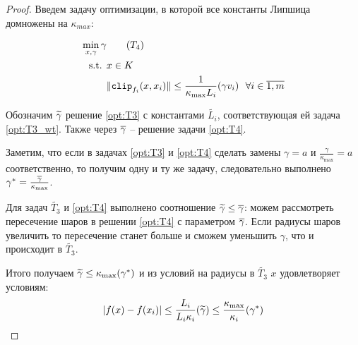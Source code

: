 \begin{proof}
     Введем задачу оптимизации, в которой все константы Липшица домножены на $\kappa_{max}$:

    \begin{align*}
    \min_{x, \gamma} \gamma & \tag{$T_4$}\label{opt:T4} \\
    \text{s.t. } &x \in K \\
                 &\|\texttt{clip}_{f_i}(x, x_i)\| \leq \frac{1}{\kappa_{\max} L_i}(\gamma  v_i ) ~~ \forall i\in\overline{1,m}
\end{align*}

    Обозначим $\widetilde{\gamma}$ решение \ref{opt:T3} с константами $\widetilde{L_i}$, соответствующая ей задача \ref{opt:T3_wt}. Также через $\overline{\gamma}$ -- решение задачи \ref{opt:T4}.
    
     Заметим, что если в задачах \ref{opt:T3} и \ref{opt:T4} сделать замены $\gamma = a$ и $\frac{\gamma}{\kappa_{\max}} = a$ соответственно, то получим одну и ту же задачу, следовательно выполнено $\gamma^* = \frac{\overline{\gamma}}{\kappa_{\max}}$.

    Для задач $\widetilde{T_3}$  и \ref{opt:T4} выполнено соотношение $\widetilde{\gamma} \leq \overline{\gamma}$: можем рассмотреть пересечение шаров в решении \ref{opt:T4} с параметром $\overline{\gamma}$. Если радиусы шаров увеличить то пересечение станет больше и сможем уменьшить $\gamma$, что и происходит в $\widetilde{T_3}$.

     Итого получаем $\widetilde{\gamma} \leq \kappa_{\max}(\gamma^* )$ и из условий на радиусы в $\widetilde{T_3}$ $x$ удовлетворяет условиям:
     \begin{equation}
         |f(x) - f(x_i)| \leq \frac{L_i}{L_i \kappa_i}(\widetilde{\gamma}) \leq \frac{\kappa_{\max}}{ \kappa_i}(\gamma^*)
     \end{equation}
\end{proof}

